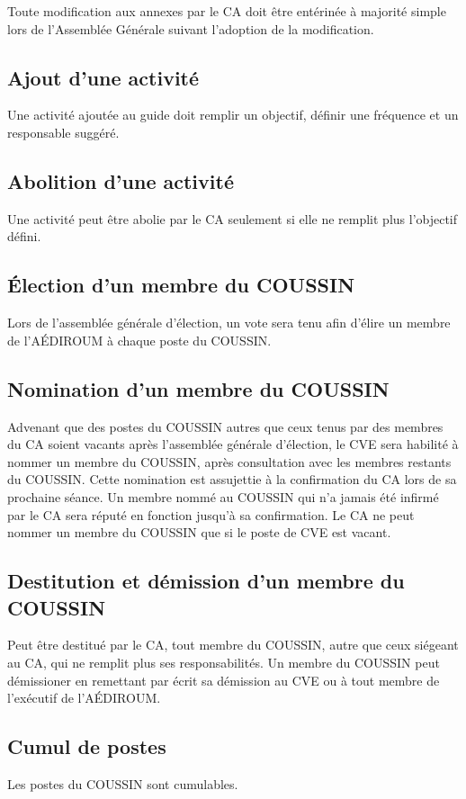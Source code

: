 \documentclass{aediroum}
\begin{document}
Toute modification aux annexes par le CA doit être entérinée à majorité simple lors de l'Assemblée Générale suivant l'adoption de la modification.

\subsection{Ajout d'une activité}
Une activité ajoutée au guide doit remplir un objectif, définir une fréquence et un responsable suggéré.

\subsection{Abolition d'une activité}
Une activité peut être abolie par le CA seulement si elle ne remplit plus l'objectif défini.

\subsection{Élection d'un membre du COUSSIN}
Lors de l'assemblée générale d'élection, un vote sera tenu afin d'élire un membre de l'AÉDIROUM à chaque poste du COUSSIN.

\subsection{Nomination d'un membre du COUSSIN}
Advenant que des postes du COUSSIN autres que ceux tenus par des membres du CA soient vacants après l'assemblée générale d'élection, le CVE sera habilité à nommer un membre du COUSSIN, après consultation avec les membres restants du COUSSIN. Cette nomination est assujettie à la confirmation du CA lors de sa prochaine séance. Un membre nommé au COUSSIN qui n'a jamais été infirmé par le CA sera réputé en fonction jusqu'à sa confirmation. Le CA ne peut nommer un membre du COUSSIN que si le poste de CVE est vacant.

\subsection{Destitution et démission d'un membre du COUSSIN}
Peut être destitué par le CA, tout membre du COUSSIN, autre que ceux siégeant au CA, qui ne remplit plus ses responsabilités. Un membre du COUSSIN peut démissioner en remettant par écrit sa démission au CVE ou à tout membre de l'exécutif de l'AÉDIROUM.

\subsection{Cumul de postes}
Les postes du COUSSIN sont cumulables.
\end{document}
